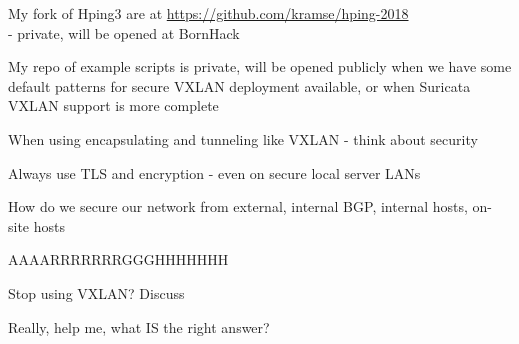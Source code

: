 \documentclass[18pt,landscape,a4paper,footrule]{foils}
\begin{document}
My fork of Hping3 are at \url{https://github.com/kramse/hping-2018}\\
- private, will be opened at BornHack

My repo of example scripts is private, will be opened publicly when we have some default patterns for secure VXLAN deployment available, or when Suricata VXLAN support is more complete



\begin{list2}
\item When using encapsulating and tunneling like VXLAN - think about security
\item Always use TLS and encryption - even on secure local server LANs
\item How do we secure our network from external, internal BGP, internal hosts, on-site hosts
\item AAAARRRRRRRGGGHHHHHHH \smiley
\item Stop using VXLAN? Discuss
\end{list2}

\vskip 2cm
Really, help me, what IS the right answer? \smiley
\end{document}
